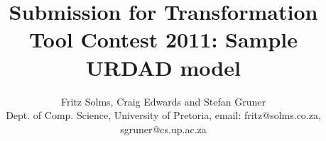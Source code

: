 \documentclass[a4paper,twoside]{article}
\begin{document}
\title{Submission for Transformation Tool Contest 2011: Sample URDAD model}

\author{ Fritz Solms, Craig Edwards and Stefan Gruner\\
  {\small Dept. of Comp. Science, University of Pretoria, email: fritz@solms.co.za, sgruner@cs.up.ac.za}}

\maketitle

%

\tableofcontents














\end{document}
